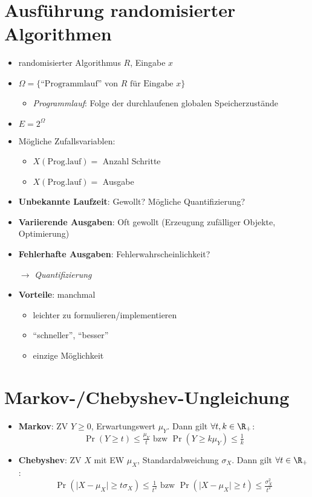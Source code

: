 \section{Ausführung randomisierter Algorithmen}

\begin{itemize}
  \item randomisierter Algorithmus $ R $, Eingabe $ x $
  \item $ \Omega = \{ \text{``Programmlauf'' von } R \text{ für Eingabe } x \} $
  \begin{itemize}
    \item \emph{Programmlauf}: Folge der durchlaufenen globalen Speicherzustände
  \end{itemize}
  \item $ E = 2^\Omega $
  \item Mögliche Zufallsvariablen:
  \begin{itemize}
    \item $ X(\text{Prog.lauf}) = $ Anzahl Schritte
    \item $ X(\text{Prog.lauf}) = $ Ausgabe
  \end{itemize}
  \item \textbf{Unbekannte Laufzeit}: Gewollt? Mögliche Quantifizierung?
  \item \textbf{Variierende Ausgaben}: Oft gewollt (Erzeugung zufälliger Objekte, Optimierung)
  \item \textbf{Fehlerhafte Ausgaben}: Fehlerwahrscheinlichkeit?
  \item[$ \to $] \emph{Quantifizierung}
  \item \textbf{Vorteile}: manchmal
  \begin{itemize}
    \item leichter zu formulieren/implementieren
    \item ``schneller'', ``besser''
    \item einzige Möglichkeit
  \end{itemize}
\end{itemize}

\section{Markov-/Chebyshev-Ungleichung}

\begin{itemize}
  \item \textbf{Markov}: ZV $ Y \geq 0 $, Erwartungswert $ \mu_Y $. Dann gilt $ \forall t,k \in \R_+ $:
  \begin{equation*}
    \Pr(Y \geq t) \leq \tfrac{\mu_Y}{t} \text{ bzw } \Pr(Y \geq k\mu_Y) \leq \tfrac{1}{k}
  \end{equation*}
  \item \textbf{Chebyshev}: ZV $ X $ mit EW $ \mu_X $, Standardabweichung $ \sigma_X $. Dann gilt $ \forall t \in \R_+ $:
  \begin{equation*}
    \Pr(\vert X - \mu_X \vert \geq t\sigma_X) \leq \tfrac{1}{t^2} \text{ bzw } \Pr(\vert X - \mu_X \vert \geq t) \leq \tfrac{\sigma^2_X}{t^2}
  \end{equation*}
\end{itemize}

